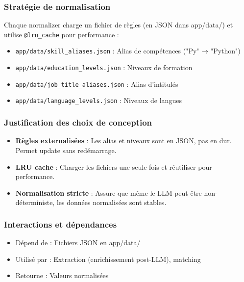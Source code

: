 \documentclass[12pt,a4paper,oneside]{book}
\begin{document}
\subsubsection{Stratégie de normalisation}

Chaque normalizer charge un fichier de règles (en JSON dans app/data/) et utilise \texttt{@lru\_cache} pour performance :

\begin{itemize}
    \item \texttt{app/data/skill\_aliases.json} : Alias de compétences ("Py" → "Python")
    \item \texttt{app/data/education\_levels.json} : Niveaux de formation
    \item \texttt{app/data/job\_title\_aliases.json} : Alias d'intitulés
    \item \texttt{app/data/language\_levels.json} : Niveaux de langues
\end{itemize}

\subsubsection{Justification des choix de conception}

\begin{itemize}
    \item \textbf{Règles externalisées} : Les alias et niveaux sont en JSON, pas en dur. Permet update sans redémarrage.
    
    \item \textbf{LRU cache} : Charger les fichiers une seule fois et réutiliser pour performance.
    
    \item \textbf{Normalisation stricte} : Assure que même le LLM peut être non-déterministe, les données normalisées sont stables.
\end{itemize}

\subsubsection{Interactions et dépendances}

\begin{itemize}
    \item Dépend de : Fichiers JSON en app/data/
    \item Utilisé par : Extraction (enrichissement post-LLM), matching
    \item Retourne : Valeurs normalisées
\end{itemize}
\end{document}
